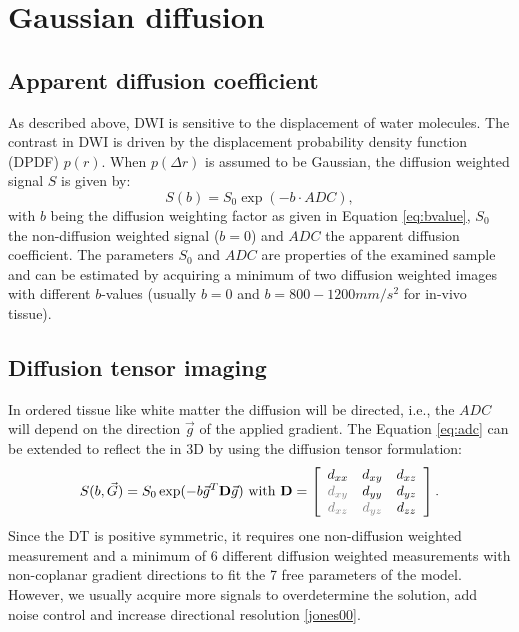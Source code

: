 \section{Gaussian diffusion}
\subsection*{Apparent diffusion coefficient}
As described above, DWI is sensitive to the displacement of water molecules. The contrast in DWI is driven by the displacement probability density function (DPDF) $p(r)$. When $p(\Delta r)$ is assumed to be Gaussian, the diffusion weighted signal $S$ is given by:
\begin{equation}
	S(b) = S_{0}\exp(-b\cdot ADC),
    \label{eq:adc}
\end{equation}
with $b$ being the diffusion weighting factor as given in Equation \ref{eq:bvalue}, $S_{0}$ the non-diffusion weighted signal ($b=0$) and $ADC$ the apparent diffusion coefficient. The parameters $S_0$ and $ADC$ are properties of the examined sample and can be estimated by acquiring a minimum of two diffusion weighted images with different $b$-values (usually $b=0$ and $b=800-1200mm/s^2$ for in-vivo tissue). 
\subsection*{Diffusion tensor imaging}
In ordered tissue like white matter the diffusion will be directed, i.e., the $ADC$ will depend on the direction $\vec{g}$ of the applied gradient. The Equation \ref{eq:adc} can be extended to reflect the in 3D by using the diffusion tensor formulation:
\begin{equation}
	S(b,\vec{G}) = S_{0}\exp(-b\vec{g}^T \mat{D}\vec{g}) \mbox{ with } \mat{D} = 
	\left[
	\begin{array}{ccc}
	d_{xx} & d_{xy} & d_{xz} \\
	{\color{gray} d_{xy}} & d_{yy} & d_{yz} \\
	{\color{gray} d_{xz}} & {\color{gray} d_{yz}} & d_{zz} 	
	\end{array} \right].	
    \label{eq:dti}
\end{equation}
Since the DT is positive symmetric, it requires one non-diffusion weighted measurement and a minimum of 6 different diffusion weighted measurements with non-coplanar gradient directions to fit the 7 free parameters of the model. However, we usually acquire more signals to overdetermine the solution, add noise control and increase directional resolution \ref{jones00}.

